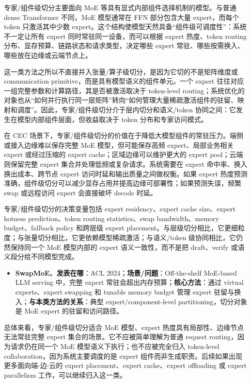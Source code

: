 \documentclass[a4paper,twocolumn,10pt]{ctexart}
\begin{document}
专家/组件级切分主要面向 MoE 等具有显式内部组件选择机制的模型。与普通 dense Transformer 不同，MoE 模型通常在 FFN 部分包含大量 expert，而每个 token 只激活其中少数 expert。这个结构使模型天然具备“组件级可调度性”：系统不一定让所有 expert 同时常驻同一设备，而可以根据 expert 热度、token routing 分布、显存预算、链路状态和请求类型，决定哪些 expert 常驻、哪些按需换入、哪些放在边缘或云端节点上。


这一类方法之所以不直接并入张量/算子级切分，是因为它切的不是矩阵维度或 communication primitive，而是具有模型语义的组件单元。一个 expert 往往对应一组完整参数和计算路径，其是否被激活取决于 token-level routing；系统优化的对象也从“如何并行执行同一层矩阵”转向“如何管理大量稀疏激活组件的驻留、映射和调度”。因此，专家/组件级切分介于层内切分和语义/token 协同之间：它发生在模型内部组件层面，但收益取决于 token 分布和专家访问模式。


在 CEC 场景下，专家/组件级切分的价值在于降低大模型组件的常驻压力。端侧或接入边缘难以保存完整 MoE 模型，但可能保存高频 expert、局部业务相关 expert 或经过压缩的 expert cache；区域边缘可以维护更大的 expert pool；云端则保留完整 expert 集合并处理低频或复杂请求。系统需要在 expert 命中率、换入换出成本、跨节点 expert 访问时延和输出质量之间做权衡。如果 expert 热度预测准确，组件级切分可以减少显存占用并提高边缘可部署性；如果预测失误，频繁 swap 或远程访问 expert 会直接破坏 decode 时延。


专家/组件级切分的决策变量包括 expert residency、expert cache size、expert hotness prediction、token routing statistics、swap bandwidth、memory budget、fallback policy 和跨层级 expert placement。与层级切分相比，它更细粒度；与张量切分相比，它更依赖模型稀疏激活；与语义/token 级协同相比，它仍然保持同一个 MoE 模型内部的 expert 语义一致性，而不是把 draft、verify 或语义段分给不同模型完成。



\begin{itemize}
\item \textbf{SwapMoE}。\textbf{发表在哪}：ACL 2024；\textbf{场景/问题}：Off-the-shelf MoE-based LLM serving 中，完整 expert 常驻会超出内存预算；\textbf{核心方法}：通过 virtual experts、expert swapping 和 tunable memory budget 管理 expert 驻留与换入；\textbf{与本类方法的关系}：典型 expert/component-level partitioning，切分对象是 MoE expert 的驻留和访问路径。
\end{itemize}





总体来看，专家/组件级切分适合 MoE 模型、expert 热度具有局部性、边缘节点无法常驻完整 expert 集合的场景。它不应被简单理解为普通 request routing，因为请求仍在同一个 MoE 模型语义下执行；也不应被完全归入 token-level collaboration，因为系统主要调度的是 expert 组件而非生成职责。后续如果出现更多面向端-边-云的 expert placement、expert cache、expert offloading 或 expert parallelism 工作，可以继续归入这一类。
\end{document}
